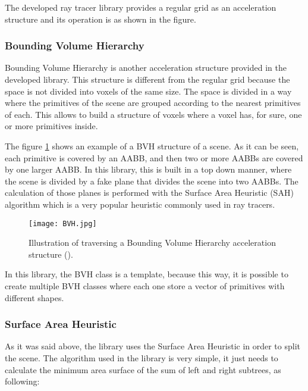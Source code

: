 \par
The developed ray tracer library provides a regular grid as an acceleration structure and its operation is as shown in the figure.

\subsubsection{Bounding Volume Hierarchy}

\par
Bounding Volume Hierarchy is another acceleration structure provided in the developed library.
This structure is different from the regular grid because the space is not divided into voxels of the same size.
The space is divided in a way where the primitives of the scene are grouped according to the nearest primitives of each.
This allows to build a structure of voxels where a voxel has, for sure, one or more primitives inside.

\par
The figure \ref{BVH.} shows an example of a BVH structure of a scene.
As it can be seen, each primitive is covered by an AABB, and then two or more AABBs are covered by one larger AABB.
In this library, this is built in a top down manner, where the scene is divided by a fake plane that divides the scene into two AABBs.
The calculation of those planes is performed with the Surface Area Heuristic (SAH) algorithm which is a very popular heuristic commonly used in ray tracers.

\begin{figure}[H]
	\centering
	\caption{Illustration of traversing a Bounding Volume Hierarchy acceleration structure (\cite{BVH}).}
	\label{BVH.}
	\texttt{[image: BVH.jpg]}
\end{figure}

\par
In this library, the BVH class is a template, because this way, it is possible to create multiple BVH classes where each one store a vector of primitives with different shapes.

\subsubsection{Surface Area Heuristic}

\par
As it was said above, the library uses the Surface Area Heuristic in order to split the scene.
The algorithm used in the library is very simple, it just needs to calculate the minimum area surface of the sum of left and right subtrees, as following:

